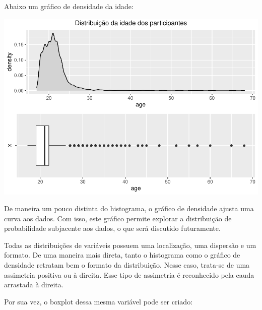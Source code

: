 \documentclass[
]{book}
\newenvironment{Shaded}{\begin{snugshade}}{\end{snugshade}}
\newcommand{\DataTypeTok}[1]{\textcolor[rgb]{0.13,0.29,0.53}{#1}}
\newcommand{\KeywordTok}[1]{\textcolor[rgb]{0.13,0.29,0.53}{\textbf{#1}}}
\newcommand{\NormalTok}[1]{#1}
\newcommand{\OperatorTok}[1]{\textcolor[rgb]{0.81,0.36,0.00}{\textbf{#1}}}
\newcommand{\StringTok}[1]{\textcolor[rgb]{0.31,0.60,0.02}{#1}}
\begin{document}
Abaixo um gráfico de densidade da idade:

\begin{Shaded}
\end{Shaded}

\begin{center}\includegraphics{gitbook-demo_files/figure-latex/unnamed-chunk-19-1} \end{center}

De maneira um pouco distinta do histograma, o gráfico de densidade ajusta uma curva aos dados. Com isso, este gráfico permite explorar a distribuição de probabilidade subjacente aos dados, o que será discutido futuramente.

Todas as distribuições de variáveis possuem uma localização, uma dispersão e um formato. De uma maneira mais direta, tanto o histograma como o gráfico de densidade retratam bem o formato da distribuição. Nesse caso, trata-se de uma assimetria positiva ou à direita. Esse tipo de assimetria é reconhecido pela cauda arrastada à direita.

Por sua vez, o boxplot dessa mesma variável pode ser criado:

\begin{Shaded}
\end{Shaded}
\end{document}
